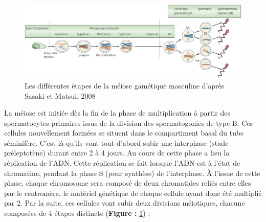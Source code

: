 \documentclass[12pt,twoside]{reedthesis}
\theoremstyle{definition}
\theoremstyle{definition}
\theoremstyle{remark}
\begin{document}
  \begin{figure}
  
  {\centering \includegraphics[scale=0.33]{figure/Meiosis_Stages} 
  
  }
  
  \caption[Les différentes étapes de la méiose gamétique masculine]{Les différentes étapes de la méiose gamétique masculine d'après Sasaki et Matsui, 2008}\label{fig:meiose}
  \end{figure}
  
  La méiose est initiée dès la fin de la phase de multiplication à partir
  des spermatocytes primaires issus de la division des spermatogonies de
  type B. Ces cellules nouvellement formées se situent dans le
  compartiment basal du tube séminifère. C'est là qu'ils vont tout d'abord
  subir une interphase (stade préleptotène) durant entre 2 à 4 jours. Au
  cours de cette phase a lieu la réplication de l'ADN. Cette réplication
  se fait lorsque l'ADN est à l'état de chromatine, pendant la phase S
  (pour synthèse) de l'interphase. À l'issue de cette phase, chaque
  chromosome sera composé de deux chromatides reliés entre elles par le
  centromère, le matériel génétique de chaque cellule ayant donc été
  multiplié par 2. Par la suite, ces cellules vont subir deux divisions
  méiotiques, chacune composées de 4 étapes distincte (\textbf{Figure :
  }\ref{fig:meiose}) :
  
\end{document}
